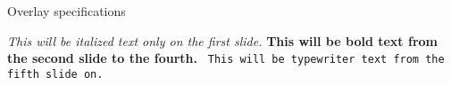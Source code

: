 
\begin{frame}{Overlay specifications}

    \textit<1>{
        This will be italized text only on the first slide.}
    \textbf<2-4>{
        This will be bold text from the second slide to the fourth.}
    \texttt<5->{
        This will be typewriter text from the fifth slide on.}
    
\end{frame}